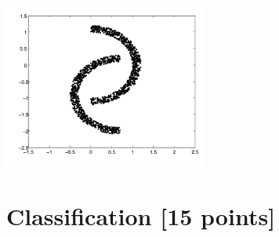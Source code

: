 \documentclass[a4paper,12pt,fleqn]{article}
\begin{document}
\begin{enumerate}
\begin{center}
\includegraphics[width = 0.5\textwidth]{moon}
\end{center}

\end{enumerate}

\clearpage
\section{Classification [15 points]}
\end{document}
